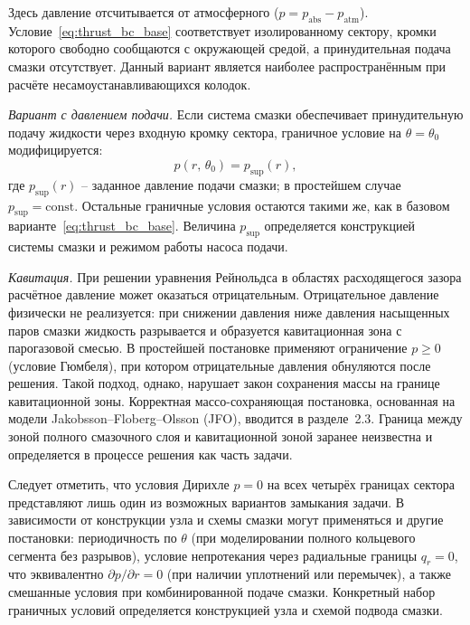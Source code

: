 Здесь давление отсчитывается от атмосферного ($p = p_{\mathrm{abs}} - p_{\mathrm{atm}}$). Условие~\eqref{eq:thrust_bc_base} соответствует изолированному сектору, кромки которого свободно сообщаются с окружающей средой, а принудительная подача смазки отсутствует. Данный вариант является наиболее распространённым при расчёте несамоустанавливающихся колодок.

\textit{Вариант с давлением подачи.} Если система смазки обеспечивает принудительную подачу жидкости через входную кромку сектора, граничное условие на $\theta = \theta_0$ модифицируется:
\begin{equation}
p(r,\,\theta_0) = p_{\mathrm{sup}}(r),
\label{eq:thrust_bc_supply}
\end{equation}
где $p_{\mathrm{sup}}(r)$ -- заданное давление подачи смазки; в простейшем случае $p_{\mathrm{sup}} = \mathrm{const}$. Остальные граничные условия остаются такими же, как в базовом варианте~\eqref{eq:thrust_bc_base}. Величина $p_{\mathrm{sup}}$ определяется конструкцией системы смазки и режимом работы насоса подачи.

\textit{Кавитация.} При решении уравнения Рейнольдса в областях расходящегося зазора расчётное давление может оказаться отрицательным. Отрицательное давление физически не реализуется: при снижении давления ниже давления насыщенных паров смазки жидкость разрывается и образуется кавитационная зона с парогазовой смесью. В простейшей постановке применяют ограничение $p \geq 0$ (условие Гюмбеля), при котором отрицательные давления обнуляются после решения. Такой подход, однако, нарушает закон сохранения массы на границе кавитационной зоны. Корректная массо-сохраняющая постановка, основанная на модели Jakobsson--Floberg--Olsson (JFO), вводится в разделе~2.3. Граница между зоной полного смазочного слоя и кавитационной зоной заранее неизвестна и определяется в процессе решения как часть задачи.

Следует отметить, что условия Дирихле $p = 0$ на всех четырёх границах сектора представляют лишь один из возможных вариантов замыкания задачи. В зависимости от конструкции узла и схемы смазки могут применяться и другие постановки: периодичность по $\theta$ (при моделировании полного кольцевого сегмента без разрывов), условие непротекания через радиальные границы $q_r = 0$, что эквивалентно $\partial p/\partial r = 0$ (при наличии уплотнений или перемычек), а также смешанные условия при комбинированной подаче смазки. Конкретный набор граничных условий определяется конструкцией узла и схемой подвода смазки.

